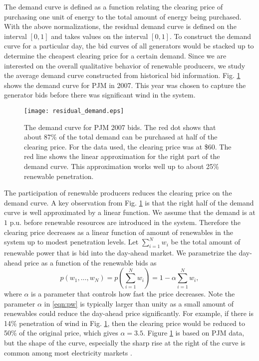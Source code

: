 \documentclass[journal]{IEEEtran}
\begin{document}
The demand curve is defined as a function relating the clearing price of purchasing one unit of energy to the total amount of energy being purchased. With the above normalizations, the residual demand curve is defined on the interval $[0,1]$  and takes values on the interval $[0,1]$. To construct the demand curve for a particular day, the bid curves of all generators would be stacked up to determine the cheapest clearing price for a certain demand. Since we are interested on the overall qualitative behavior of renewable producers, we study the average demand curve constructed from historical bid information. Fig. \ref{fig:pjm_bid} shows the demand curve for PJM in 2007. This year was chosen to capture the generator bids before there was significant wind in the system. 
\begin{figure}[ht]
\hspace{-0.3cm}
\texttt{[image: residual\_demand.eps]}
\caption{ The demand curve for PJM 2007 bids. The red dot shows that about 87\% of the total demand can be purchased at half of the clearing price. For the data used, the clearing price was at \$60.
The red line shows the linear approximation for the right part of the demand curve. This approximation works well up to about 25\% renewable penetration.}
\label{fig:pjm_bid}
\end{figure}

The participation of renewable producers reduces the clearing price on the demand curve. A key observation from Fig. \ref{fig:pjm_bid} is that the right half of the demand curve is well approximated by a linear function. We assume that the demand is at $1$ p.u. before renewable resources are introduced in the system. Therefore the clearing price decreases as a linear function of amount of renewables in the system up to modest penetration levels. Let $\sum_{i=1}^N w_i$ be the total amount of renewable power that is bid into the day-ahead market.
 We parametrize the day-ahead price as a function of the renewable bids as 
\begin{equation} \label{eqn:pw}
p(w_1,\dots,w_N)=p\left(\sum_{i=1}^N w_i\right)=1-\alpha \sum_{i=1}^N w_i,
\end{equation}
where $\alpha$ is a parameter that controls how fast the price decreases. Note the parameter $\alpha$ in \eqref{eqn:pw} is typically larger than unity as a small amount of renewables could reduce the day-ahead price significantly.  For example, if there is 14\% penetration of wind in Fig. \ref{fig:pjm_bid}, then the clearing price would be reduced to 50\% of the original price, which gives $\alpha=3.5$. Figure \ref{fig:pjm_bid} is based on PJM data, but the shape of the curve, especially the sharp rise at the right of the curve is common among most electricity markets \cite{Weron06}. 
\end{document}
